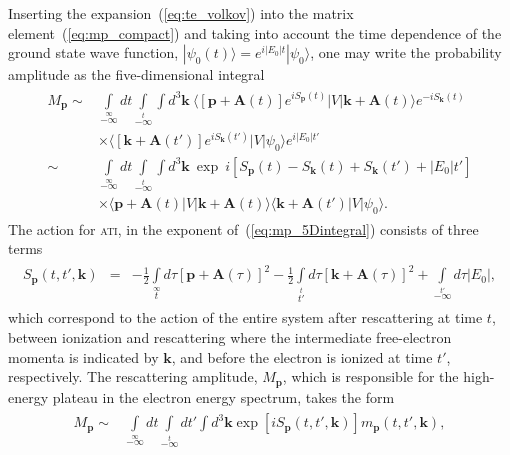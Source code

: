 Inserting the expansion~(\ref{eq:te_volkov}) into the matrix
element~(\ref{eq:mp_compact}) and taking into account the time
dependence of the ground state wave function, $|\psi_{0}(t) \rangle =
e^{i|E_{0}|t} | \psi_{0} \rangle$, one may write the probability
amplitude as the five-dimensional integral~\cite{KopoldOptComm2000}
%
\begin{eqnarray}
  \label{eq:mp_5Dintegral}
  \begin{split}
    M_{\mathbf{p}} \sim & \int\limits_{-\infty}\limits^{\infty} dt
    \int\limits_{-\infty}\limits^{t} \int d^{3}\mathbf{k}\ 
    \langle [\mathbf{p} + \mathbf{A}(t)] e^{iS_{\mathbf{p}}(t)} | V |
    \mathbf{k} + \mathbf{A}(t) \rangle e^{-iS_{\mathbf{k}}(t)} \\
    & \times
    \langle [\mathbf{k} + \mathbf{A}(t')] e^{iS_{\mathbf{k}}(t')} | V |
    \psi_{0} \rangle e^{i|E_{0}|t'} \\
    \sim &
    \int\limits_{-\infty}\limits^{\infty} dt
    \int\limits_{-\infty}\limits^{t} \int d^{3}\mathbf{k}\ 
    \exp\ i\left[ S_{\mathbf{p}}(t) - S_{\mathbf{k}}(t)
      + S_{\mathbf{k}}(t') + |E_{0}|t' \right] \\
    & \times
    \langle \mathbf{p} + \mathbf{A}(t) | V |
    \mathbf{k} + \mathbf{A}(t) \rangle 
    \langle \mathbf{k} + \mathbf{A}(t') | V |
    \psi_{0} \rangle.
  \end{split}
\end{eqnarray}
%
The action for \textsc{ati}, in the exponent
of~(\ref{eq:mp_5Dintegral}) consists of three terms
%
\begin{eqnarray}
  \label{eq:action_mpintegral}
  \begin{split}
    S_{\mathbf{p}}(t, t', \mathbf{k}) & = & - \frac{1}{2}
    \int\limits_{t}\limits^{\infty} d\tau [\mathbf{p} + \mathbf{A}(\tau)]^{2}
    - \frac{1}{2} \int\limits_{t'}\limits^{t} d\tau [\mathbf{k} + \mathbf{A}(\tau)]^{2}
    + \int\limits_{-\infty}\limits^{t'} d\tau |E_{0}|,
  \end{split}
\end{eqnarray}
%
which correspond to the action of the entire system after rescattering
at time $t$, between ionization and rescattering where the
intermediate free-electron momenta is indicated by $\mathbf{k}$, and
before the electron is ionized at time $t'$, respectively. The
rescattering amplitude, $M_{\mathbf{p}}$, which is responsible for the
high-energy plateau in the electron energy spectrum, takes the
form~\cite{Becker_ati2002,BeckerTEOp_2006}
%
\begin{eqnarray}
\label{eq:mp_final}
\begin{split}
M_{\mathbf{p}} \sim &
\int\limits_{-\infty}\limits^{\infty} dt
\int\limits_{-\infty}\limits^{t} dt'
\int d^{3}\mathbf{k} \exp \left[ iS_{\mathbf{p}}(t, t', \mathbf{k}) \right]
m_{\mathbf{p}}(t, t', \mathbf{k}),
\end{split}
\end{eqnarray}
